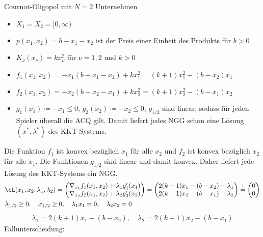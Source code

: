 \begin{beispiel}\label{ex:3-2} Cournot-Oligopol mit $N = 2$ Unternehmen
  \begin{itemize}
  \item $X_{1} = X_{2} = [0, \infty)$
  \item $p(x_{1}, x_{2}) = b - x_{1} - x_{2}$ ist der Preis einer Einheit des Produkts für $b > 0$
  \item $K_{\nu}(x_{\nu}) = k x_{\nu}^{2}$ für $\nu = 1, 2$ und $ k > 0$
  \item $f_{1}(x_{1}, x_{2}) = - x_{1}(b- x_{1} - x_{2}) + kx_{1}^{2} = (k + 1) x_{1}^{2} - (b - x_{2})x_{1}$
  \item $f_{2}(x_{1}, x_{2}) = - x_{2}(b- x_{2} - x_{1}) + kx_{2}^{2} = (k + 1) x_{2}^{2} - (b - x_{1})x_{2}$
  \item $g_{1}(x_{1})\coloneqq - x_{1} \leq 0$, $g_{2}(x_{2})\coloneqq - x_{2} \leq 0$, $g_{1/2}$ sind linear, sodass für jeden Spieler überall die ACQ gilt. Damit liefert jedes NGG schon eine Lösung $(x^{*}, \lambda^{*})$ des KKT-Systems. 
  \end{itemize}
Die Funktion $f_{1}$ ist konvex bezüglich $x_{1}$ für alle $x_{2}$ und $f_{2}$ ist konvex bezüglich $x_{2}$ für alle $x_{1}$. Die Funktionen $g_{1/2}$ sind linear und damit konvex. Daher liefert jede Lösung des KKT-Systems ein NGG.
\begin{align*}
 & \cL(x_{1}, x_{2}, \lambda_{1}, \lambda_{2}) =
  \begin{pmatrix}
    \nabla_{x_{1}}f_{1}(x_{1}, x_{2}) + \lambda_{1} g_{1}' (x_{1})\\
    \nabla_{x_{2}}f_{2}(x_{1}, x_{2}) + \lambda_{2} g_{2}' (x_{2})
  \end{pmatrix}
=
\begin{pmatrix}
  2(k+1)x_{1} - (b - x_{2}) - \lambda_{1}\\
  2(k+1)x_{2} - (b - x_{1}) - \lambda_{2}
\end{pmatrix}
\stackrel ! =
\begin{pmatrix}
  0\\0
\end{pmatrix}\\
&\lambda_{1/2} \geq 0, \quad x_{1/2} \geq 0, \quad \lambda_{1}x_{1} = 0, \quad \lambda_{2}x_{2} = 0 \notag
\end{align*}
\begin{align}\label{eq:3-13}
  \lambda_{1} = 2(k + 1)x_{1} - (b - x_2), \quad   \lambda_{2} = 2(k + 1)x_{2} - (b - x_1)
\end{align}
Fallunterscheidung:

\end{beispiel}
